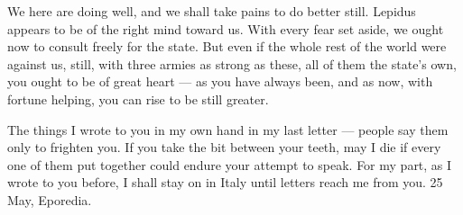 

 We here are doing well, and we shall take pains to do better still. Lepidus appears to be of the right mind toward us. With every fear set aside, we ought now to consult freely for the state. But even if the whole rest of the world were against us, still, with three armies as strong as these, all of them the state's own, you ought to be of great heart --- as you have always been, and as now, with fortune helping, you can rise to be still greater.

 The things I wrote to you in my own hand in my last letter --- people say them only to frighten you. If you take the bit between your teeth, may I die if every one of them put together could endure your attempt to speak. For my part, as I wrote to you before, I shall stay on in Italy until letters reach me from you. 25 May, Eporedia.
